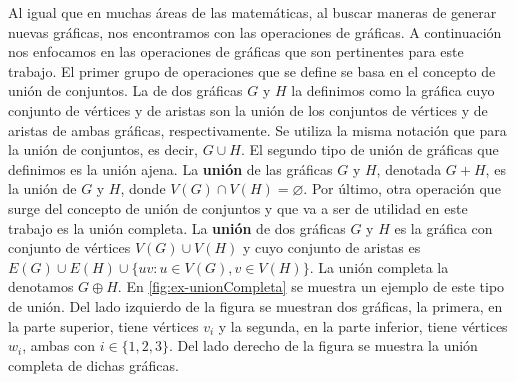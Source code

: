 Al igual que en muchas \'areas de las matem\'aticas, al buscar maneras de
generar nuevas gr\'aficas, nos encontramos con las operaciones de gr\'aficas. A
continuaci\'on nos enfocamos en las operaciones de gr\'aficas que son
pertinentes para este trabajo. El primer grupo de operaciones que se define se
basa en el concepto de uni\'on de conjuntos. La  de dos
gr\'aficas $G$ y $H$ la definimos como la gr\'afica cuyo conjunto de v\'ertices
y de aristas son la uni\'on de los conjuntos de v\'ertices  y de aristas de
ambas gr\'aficas, respectivamente. Se utiliza la misma notaci\'on que para la
uni\'on de conjuntos, es decir, $G \cup H$. El segundo tipo de uni\'on de
gr\'aficas que definimos es la uni\'on ajena. La \textbf{uni\'on}
 de las gr\'aficas $G$ y $H$, denotada $G + H$, es la
uni\'on de $G$ y $H$, donde $V(G) \cap V(H) = \varnothing$. Por \'ultimo, otra
operaci\'on que surge del concepto de uni\'on de conjuntos y que va a ser de
utilidad en este trabajo es la uni\'on completa. La \textbf{uni\'on}
 de dos gr\'aficas $G$ y $H$ es la gr\'afica con
conjunto de v\'ertices $V(G) \cup V(H)$ y cuyo conjunto de aristas es $E(G) \cup
E(H) \cup \{uv \colon u \in V(G), v \in V(H) \}$. La uni\'on completa la
denotamos $G \oplus H$. En \cref{fig:ex-unionCompleta} se muestra un ejemplo de
este tipo de uni\'on. Del lado izquierdo de la figura se muestran dos
gr\'aficas, la primera, en la parte superior, tiene v\'ertices $v_i$ y la
segunda, en la parte inferior, tiene v\'ertices $w_i$, ambas con $i \in \{1, 2
,3\}$. Del lado derecho de la figura se muestra la uni\'on completa de dichas
gr\'aficas.

